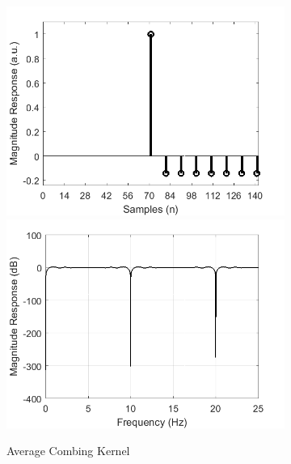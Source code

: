 \documentclass[a4paper]{article}
\begin{document}
\begin{figure}[hbtp]
\begin{subfigure}{.33\textwidth}
    \includegraphics[width=\textwidth]{img/kernel_ave.png}\\
    \includegraphics[width=\textwidth]{img/mag_ave.png}
    \caption{Average Combing Kernel}\label{fig:AverageKernel}
\end{subfigure}
\begin{subfigure}{.33\textwidth}

\end{subfigure}
\end{figure}
\end{document}
